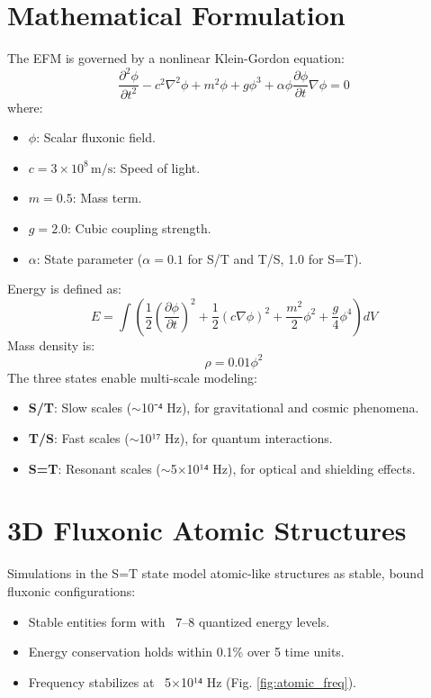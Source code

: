 \documentclass{article}
\begin{document}
\section{Mathematical Formulation}
The EFM is governed by a nonlinear Klein-Gordon equation:
\begin{equation}
\frac{\partial^2 \phi}{\partial t^2} - c^2 \nabla^2 \phi + m^2 \phi + g \phi^3 + \alpha \phi \frac{\partial \phi}{\partial t} \nabla \phi = 0
\end{equation}
where:
\begin{itemize}
    \item \(\phi\): Scalar fluxonic field.
    \item \(c = 3 \times 10^8 \, \text{m/s}\): Speed of light.
    \item \(m = 0.5\): Mass term.
    \item \(g = 2.0\): Cubic coupling strength.
    \item \(\alpha\): State parameter (\(\alpha = 0.1\) for S/T and T/S, 1.0 for S=T).
\end{itemize}
Energy is defined as:
\begin{equation}
E = \int \left( \frac{1}{2} \left(\frac{\partial \phi}{\partial t}\right)^2 + \frac{1}{2} (c \nabla \phi)^2 + \frac{m^2}{2} \phi^2 + \frac{g}{4} \phi^4 \right) dV
\end{equation}
Mass density is:
\begin{equation}
\rho = 0.01 \phi^2
\end{equation}
The three states enable multi-scale modeling:
\begin{itemize}
    \item \textbf{S/T}: Slow scales ($\sim$10⁻⁴ Hz), for gravitational and cosmic phenomena.
    \item \textbf{T/S}: Fast scales ($\sim$10¹⁷ Hz), for quantum interactions.
    \item \textbf{S=T}: Resonant scales ($\sim$5$\times$10¹⁴ Hz), for optical and shielding effects.
\end{itemize}

\section{3D Fluxonic Atomic Structures}
Simulations in the S=T state model atomic-like structures as stable, bound fluxonic configurations:
\begin{itemize}
    \item Stable entities form with ~7–8 quantized energy levels.
    \item Energy conservation holds within 0.1\% over 5 time units.
    \item Frequency stabilizes at ~5$\times$10¹⁴ Hz (Fig. \ref{fig:atomic_freq}).
\end{itemize}
\end{document}
